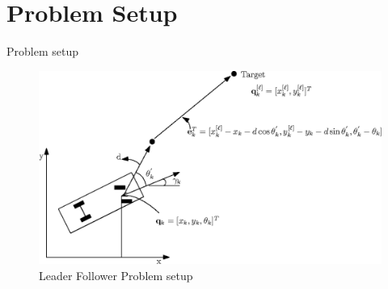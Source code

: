 \documentclass{beamer}
\begin{document}
\section{Problem Setup}
\begin{frame}{Problem setup}
\begin{center}
\begin{figure}
\includegraphics[scale=0.8]{figs/img/LF-Setup.eps}
\caption{Leader Follower Problem setup}
\end{figure}
\end{center}
\end{frame}
\end{document}
